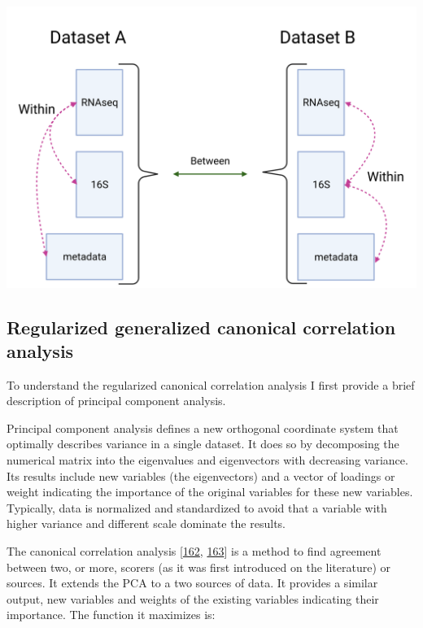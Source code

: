 \documentclass[
  12pt,
  a4paper,
  twoside,
  openright]{book}
\let\origfigure\figure
\let\endorigfigure\endfigure
\renewenvironment{figure}[1][2] {
    \expandafter\origfigure\expandafter[!htp]
} {
    \endorigfigure
}
\begin{document}
\begin{figure}
\includegraphics[width=1\linewidth]{images/multiomic_datasets} \caption[Multi-omic relationships.]{Multi-omic relationships on different datasets. Integration methods focus on relationships within datasets. Common relationships between datasets are used as confirmation/validation. Created with BioRender.com}\label{fig:multiomic-datasets}
\end{figure}

\hypertarget{regularized-generalized-canonical-correlation-analysis}{%
\subsection{Regularized generalized canonical correlation analysis}\label{regularized-generalized-canonical-correlation-analysis}}

To understand the regularized canonical correlation analysis I first provide a brief description of principal component analysis.

Principal component analysis defines a new orthogonal coordinate system that optimally describes variance in a single dataset.
It does so by decomposing the numerical matrix into the eigenvalues and eigenvectors with decreasing variance.
Its results include new variables (the eigenvectors) and a vector of loadings or weight indicating the importance of the original variables for these new variables.
Typically, data is normalized and standardized to avoid that a variable with higher variance and different scale dominate the results.

The canonical correlation analysis {[}\protect\hyperlink{ref-jordan1875}{162}, \protect\hyperlink{ref-hotelling1936}{163}{]} is a method to find agreement between two, or more, scorers (as it was first introduced on the literature) or sources.
It extends the PCA to a two sources of data.
It provides a similar output, new variables and weights of the existing variables indicating their importance.
The function it maximizes is:
\end{document}
